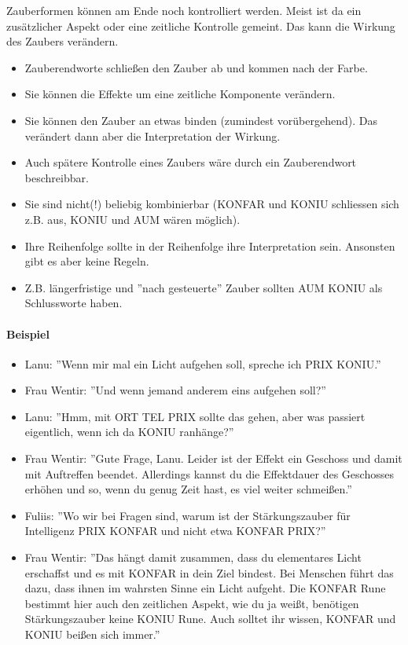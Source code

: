 \documentclass{article}
\begin{document}
Zauberformen können am Ende noch kontrolliert werden. Meist ist da ein zusätzlicher Aspekt oder eine zeitliche
Kontrolle gemeint. Das kann die Wirkung des Zaubers verändern.

\begin{itemize}
\item Zauberendworte schließen den Zauber ab und kommen nach der Farbe.
\item Sie können die Effekte um eine zeitliche Komponente verändern.
\item Sie können den Zauber an etwas binden (zumindest vorübergehend). Das verändert dann aber die Interpretation der Wirkung.
\item Auch spätere Kontrolle eines Zaubers wäre durch ein Zauberendwort beschreibbar.
\item Sie sind nicht(!) beliebig kombinierbar (KONFAR und KONIU schliessen sich z.B. aus, KONIU und AUM wären möglich).
\item Ihre Reihenfolge sollte in der Reihenfolge ihre Interpretation sein. Ansonsten gibt es aber keine Regeln.
\item Z.B. längerfristige und ''nach gesteuerte'' Zauber sollten AUM KONIU als Schlussworte haben.
\end{itemize}

\paragraph{Beispiel}

\begin{itemize}
\item Lanu: ''Wenn mir mal ein Licht aufgehen soll, spreche ich PRIX KONIU.''
\item Frau Wentir: ''Und wenn jemand anderem eins aufgehen soll?''
\item Lanu: ''Hmm, mit ORT TEL PRIX sollte das gehen, aber was passiert eigentlich, wenn ich da KONIU ranhänge?''
\item Frau Wentir: ''Gute Frage, Lanu. Leider ist der Effekt ein Geschoss und damit mit Auftreffen beendet. Allerdings kannst du die Effektdauer des Geschosses erhöhen und so, wenn du genug Zeit hast, es viel weiter schmeißen.''
\item Fuliis: ''Wo wir bei Fragen sind, warum ist der Stärkungszauber für Intelligenz PRIX KONFAR und nicht etwa KONFAR PRIX?''
\item Frau Wentir: ''Das hängt damit zusammen, dass du elementares Licht erschaffst und es mit KONFAR in dein Ziel bindest. Bei Menschen führt das dazu, dass ihnen im wahrsten Sinne ein Licht aufgeht. Die KONFAR Rune bestimmt hier auch den zeitlichen Aspekt, wie du ja weißt, benötigen Stärkungszauber keine KONIU Rune. Auch solltet ihr wissen, KONFAR und KONIU beißen sich immer.''
\end{itemize}
\end{document}
